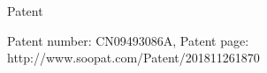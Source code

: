 
\begin{rubric}{Patent}

\entry*[2018.11]%
Patent number: CN09493086A, Patent page:
http://www.soopat.com/Patent/201811261870


\end{rubric}
